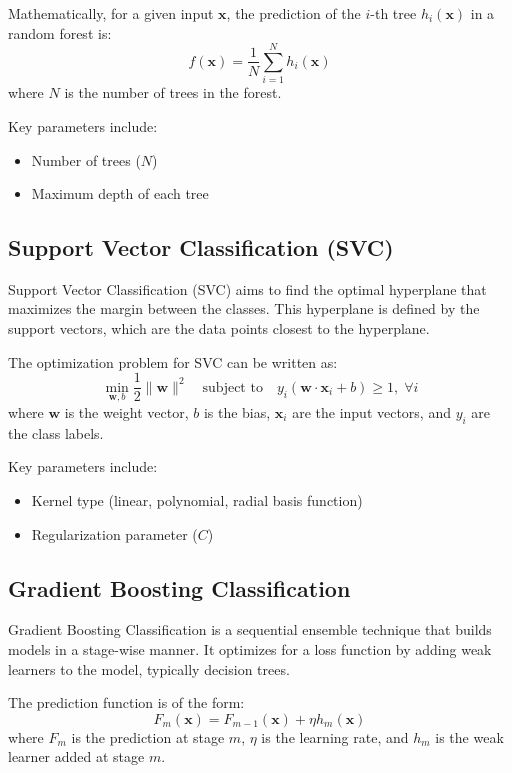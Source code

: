 Mathematically, for a given input $\mathbf{x}$, the prediction of the $i$-th tree $h_i(\mathbf{x})$ in a random forest is:
\[
f(\mathbf{x}) = \frac{1}{N} \sum_{i=1}^N h_i(\mathbf{x})
\]
where $N$ is the number of trees in the forest.

Key parameters include:
\begin{itemize}
    \item Number of trees ($N$)
    \item Maximum depth of each tree
\end{itemize}

\subsection{Support Vector Classification (SVC)}

Support Vector Classification (SVC) aims to find the optimal hyperplane that maximizes the margin between the classes. This hyperplane is defined by the support vectors, which are the data points closest to the hyperplane.

The optimization problem for SVC can be written as:
\[
\min_{\mathbf{w}, b} \frac{1}{2} \|\mathbf{w}\|^2 \quad \text{subject to} \quad y_i (\mathbf{w} \cdot \mathbf{x}_i + b) \geq 1, \; \forall i
\]
where $\mathbf{w}$ is the weight vector, $b$ is the bias, $\mathbf{x}_i$ are the input vectors, and $y_i$ are the class labels.

Key parameters include:
\begin{itemize}
    \item Kernel type (linear, polynomial, radial basis function)
    \item Regularization parameter ($C$)
\end{itemize}

\subsection{Gradient Boosting Classification}

Gradient Boosting Classification is a sequential ensemble technique that builds models in a stage-wise manner. It optimizes for a loss function by adding weak learners to the model, typically decision trees.

The prediction function is of the form:
\[
F_m(\mathbf{x}) = F_{m-1}(\mathbf{x}) + \eta h_m(\mathbf{x})
\]
where $F_m$ is the prediction at stage $m$, $\eta$ is the learning rate, and $h_m$ is the weak learner added at stage $m$.

